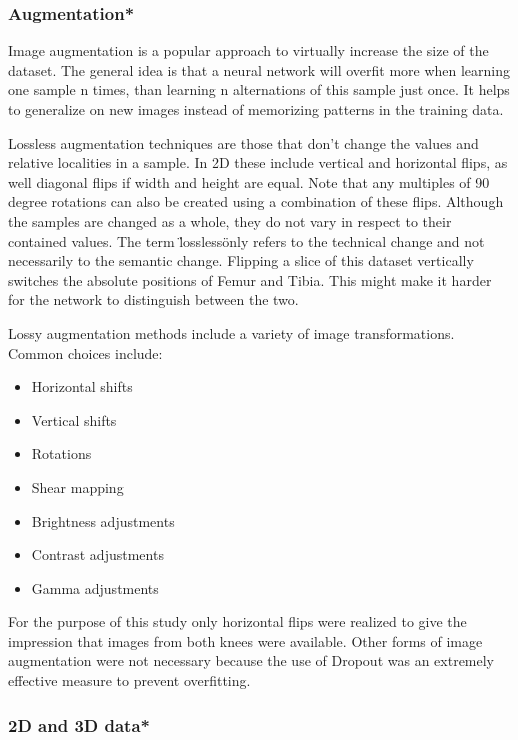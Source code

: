 \subsubsection{Augmentation*}

Image augmentation is a popular approach to virtually increase the size of the dataset. The general idea is that a neural network will overfit more when learning one sample n times, than learning n alternations of this sample just once. It helps to generalize on new images instead of memorizing patterns in the training data.

Lossless augmentation techniques are those that don't change the values and relative localities in a sample. In 2D these include vertical and horizontal flips, as well diagonal flips if width and height are equal. Note that any multiples of 90 degree rotations can also be created using a combination of these flips. Although the samples are changed as a whole, they do not vary in respect to their contained values. The term \"lossless\" only refers to the technical change and not necessarily to the semantic change. Flipping a slice of this dataset vertically switches the absolute positions of Femur and Tibia. This might make it harder for the network to distinguish between the two.

Lossy augmentation methods include a variety of image transformations. Common choices include:

\begin{itemize}
\item Horizontal shifts
\item Vertical shifts
\item Rotations
\item Shear mapping
\item Brightness adjustments
\item Contrast adjustments
\item Gamma adjustments
\end{itemize}

For the purpose of this study only horizontal flips were realized to give the impression that images from both knees were available. Other forms of image augmentation were not necessary because the use of Dropout was an extremely effective measure to prevent overfitting.

\subsubsection{2D and 3D data*}


